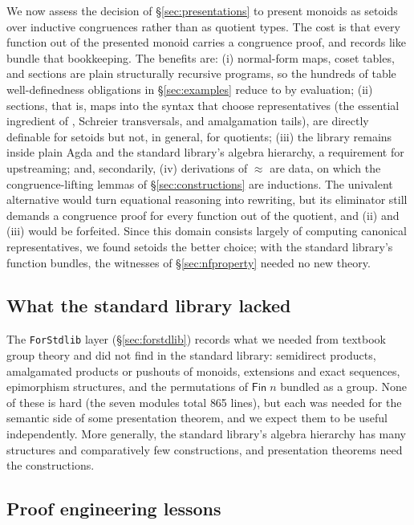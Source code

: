 We now assess the decision of \S\ref{sec:presentations} to present
monoids as setoids over inductive congruences rather than as quotient types.
The cost is that every function out of the presented monoid carries a
congruence proof, and records like  bundle that bookkeeping.
The benefits are: (i) normal-form maps, coset tables, and sections are
plain structurally recursive programs, so the hundreds of table
well-definedness obligations in \S\ref{sec:examples} reduce to 
by evaluation;
(ii) sections, that is, maps into the syntax that
choose representatives (the essential ingredient of
, Schreier transversals, and amalgamation tails), are
directly definable for setoids but not, in general, for quotients;
(iii) the library remains inside plain Agda and the
standard library's algebra hierarchy, a requirement for upstreaming;
and, secondarily, (iv) derivations of $\approx$ are data, on which the
congruence-lifting lemmas of \S\ref{sec:constructions} are inductions.
The univalent alternative \cite{vezzosi2019cubical,cubicallibrary} would
turn equational reasoning into rewriting, but its eliminator still
demands a congruence proof for every function out of the quotient, and
(ii) and (iii) would be forfeited.  Since this domain consists largely of
computing canonical representatives, we found setoids the better choice;
with the standard library's function bundles, the witnesses of
\S\ref{sec:nfproperty} needed no new theory.

\subsection{What the standard library lacked}

The \texttt{ForStdlib} layer (\S\ref{sec:forstdlib}) records what we
needed from textbook group theory and did not find in the standard
library: semidirect products,
amalgamated products or pushouts of monoids, extensions and exact
sequences, epimorphism structures, and the permutations of
$\mathsf{Fin}\;n$ bundled as a group.  None of these is hard (the
seven modules total 865 lines), but each was needed for the
semantic side of some presentation theorem, and we expect them to be
useful independently.  More generally, the standard
library's algebra hierarchy has many structures and comparatively few
constructions, and presentation theorems need the constructions.

\subsection{Proof engineering lessons}

